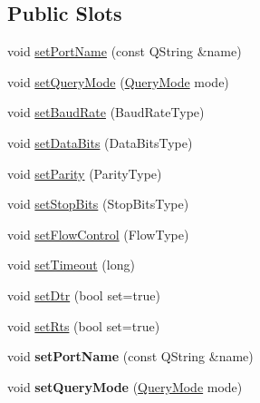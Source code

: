 \subsection*{Public Slots}
\begin{DoxyCompactItemize}
\item 
void \mbox{\hyperlink{class_qext_serial_port_ae390a8f30cec40fe28b324820a494ae3}{set\+Port\+Name}} (const Q\+String \&name)
\item 
void \mbox{\hyperlink{class_qext_serial_port_a936b593bae6e891129d347c3efb66999}{set\+Query\+Mode}} (\mbox{\hyperlink{class_qext_serial_port_a269e1f3656224a10c321bd70ab89cf64}{Query\+Mode}} mode)
\item 
void \mbox{\hyperlink{class_qext_serial_port_a4e1e8a8bd23ec4a70b6fd9ce4cda322d}{set\+Baud\+Rate}} (Baud\+Rate\+Type)
\item 
void \mbox{\hyperlink{class_qext_serial_port_a999432a58ff3ce0d622ae9d042ba4306}{set\+Data\+Bits}} (Data\+Bits\+Type)
\item 
void \mbox{\hyperlink{class_qext_serial_port_ac9c0368ed4250c2c94dfc91778c23950}{set\+Parity}} (Parity\+Type)
\item 
void \mbox{\hyperlink{class_qext_serial_port_aec0710cffb2bf37672b2ada711ea8857}{set\+Stop\+Bits}} (Stop\+Bits\+Type)
\item 
void \mbox{\hyperlink{class_qext_serial_port_a9cc5588ca4cff0287e1766915436ee05}{set\+Flow\+Control}} (Flow\+Type)
\item 
void \mbox{\hyperlink{class_qext_serial_port_adfedf676b5114c7372343c341fe6b8e4}{set\+Timeout}} (long)
\item 
void \mbox{\hyperlink{class_qext_serial_port_a5dd95caf830f6855c26c0ae70b705cea}{set\+Dtr}} (bool set=true)
\item 
void \mbox{\hyperlink{class_qext_serial_port_a177dd7a9926ee64164d520745fafbcd0}{set\+Rts}} (bool set=true)
\item 
\mbox{\label{class_qext_serial_port_ae390a8f30cec40fe28b324820a494ae3}} 
void {\bfseries set\+Port\+Name} (const Q\+String \&name)
\item 
\mbox{\label{class_qext_serial_port_a936b593bae6e891129d347c3efb66999}} 
void {\bfseries set\+Query\+Mode} (\mbox{\hyperlink{class_qext_serial_port_a269e1f3656224a10c321bd70ab89cf64}{Query\+Mode}} mode)
\item 
\mbox{\label{class_qext_serial_port_a4e1e8a8bd23ec4a70b6fd9ce4cda322d}} 

\end{DoxyCompactItemize}
